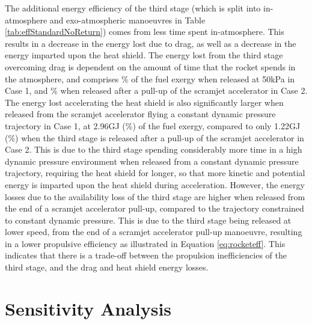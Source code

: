 The additional energy efficiency of the third stage (which is split into in-atmosphere and exo-atmospheric manoeuvres in Table \ref{tab:effStandardNoReturn}) comes from less time spent in-atmosphere. This results in a decrease in the energy lost due to drag, as well as a decrease in the energy imparted upon the heat shield. 
The energy lost from the third stage overcoming drag is dependent on the amount of time that the rocket spends in the atmosphere, and comprises \WDthreeConstqNoReturn \% of the fuel exergy when released at 50kPa in Case 1, and \WDthreeStandardNoReturn \% when released after a pull-up of the scramjet accelerator in Case 2.
The energy lost accelerating the heat shield is also significantly larger when released from the scramjet accelerator flying a constant dynamic pressure trajectory in Case 1, at 2.96GJ (\WHSthreeConstqNoReturn \%) of the fuel exergy, compared to only 1.22GJ (\WHSthreeStandardNoReturn \%) when the third stage is released after a pull-up of the scramjet accelerator in Case 2. This is due to the third stage spending considerably more time in a high dynamic pressure environment when released from a constant dynamic pressure trajectory, requiring the heat shield for longer, so that more kinetic and potential energy is imparted upon the heat shield during acceleration. However, the energy losses due to the availability loss of the third stage are higher when released from the end of a scramjet accelerator pull-up, compared to the trajectory constrained to constant dynamic pressure. This is due to the third stage being released at lower speed, from the end of a scramjet accelerator pull-up manoeuvre, resulting in a lower propulsive efficiency as illustrated in Equation \ref{eq:rocketeff}. This indicates that there is a trade-off between the propulsion inefficiencies of the third stage, and the drag and heat shield energy losses.



 

  

\section{Sensitivity Analysis}\label{sec:sensitivityNoReturn}

